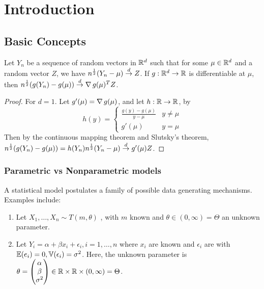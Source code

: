 \chapter{Introduction}
\label{cha:introduction}

\section{Basic Concepts}
\label{sec:basic-concepts}

\begin{thm}
  Let $Y_{n}$ be a sequence of random vectors in $\mathbb{R}^{d}$ such that
  for some $\mu \in \mathbb{R}^{d}$ and a random vector $Z$, we have
  $n^{\frac{1}{2}}(Y_{n} - \mu) \overset{d}{\rightarrow} Z$.  If $g: \mathbb{R}^{d} \rightarrow \mathbb{R}$
  is differentiable at $\mu$, then $n^{\frac{1}{2}}(g(Y_{n}) - g(\mu))
  \overset{d}{\rightarrow} \operatorname*{\nabla} g(\mu)^{T} Z$.
\end{thm}
\begin{proof}
  For $d = 1$.  Let $g'(\mu) = \operatorname*{\nabla} g(\mu)$, and let $h: \mathbb{R}
  \rightarrow \mathbb{R}$, by
  \begin{equation}
    \label{eq:134}
    h(y) =
    \begin{cases}
      \frac{g(y) - g(\mu)}{y - \mu}  & y \neq \mu \\
      g'(\mu) & y = \mu
    \end{cases}
  \end{equation}  Then by the continuous mapping theorem and Slutsky's
  theorem, $n^{\frac{1}{2}}(g(Y_{n}) - g(\mu)) = h(Y_{n})
  n^{\frac{1}{2}}(Y_{n} - \mu) \overset{d}{\rightarrow} g'(\mu) Z$.
\end{proof}

\subsection{Parametric vs Nonparametric models}
\label{sec:param-vs-nonp}

A statistical model postulates a family of possible data generating
mechanisms.  Examples include:
\begin{enumerate}
\item Let $X_{1}, \dots, X_{n} \sim T(m, \theta)$ \iid, with $m$ known
  and $\theta \in (0, \infty) = \Theta$ an unknown parameter.
\item Let $Y_{i} = \alpha + \beta x_{i}+ \epsilon_{i}, i = 1, \dots,
  n$ where $x_{i}$ are known and $\epsilon_{i}$ are \iid with
  $\E{e_{i}} = 0, \Var{\epsilon_{i}} = \sigma^{2}$.  Here, the unknown
  parameter is $\theta =
  \begin{pmatrix}
    \alpha \\
    \beta \\
    \sigma^{2}
  \end{pmatrix} \in \mathbb{R} \times \mathbb{R} \times (0, \infty) = \Theta$.
\end{enumerate}

